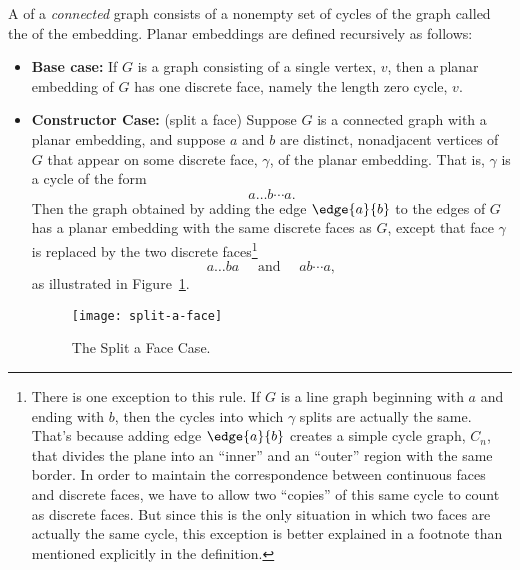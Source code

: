 \begin{definition}\label{embeddingdef}
A  of a \emph{connected} graph consists of a
nonempty set of cycles of the graph called the  of
the embedding.  Planar embeddings are defined recursively as follows:

\begin{itemize}

\item \textbf{Base case:} If $G$ is a graph consisting of a single vertex,
$v$, then a planar embedding of $G$ has one discrete face, namely the
length zero cycle, $v$.

\item \textbf{Constructor Case:} (split a face) Suppose $G$ is a
connected graph with a planar embedding, and suppose $a$ and $b$ are
distinct, nonadjacent vertices of $G$ that appear on some discrete face,
$\gamma$, of the planar embedding.  That is, $\gamma$ is a cycle of the form
\[
a \dots b \cdots a.
\]
Then the graph obtained by adding the edge $\edge{a}{b}$ to the edges of
$G$ has a planar embedding with the same discrete faces as $G$, except
that face $\gamma$ is replaced by the two discrete
faces\footnote{\label{C} There is one exception to this rule.  If $G$ is a
line graph beginning with $a$ and ending with $b$, then the cycles into
which $\gamma$ splits are actually the same.  That's because adding edge
$\edge{a}{b}$ creates a simple cycle graph, $C_n$, that divides the plane
into an ``inner'' and an ``outer'' region with the same border.  In order
to maintain the correspondence between continuous faces and discrete
faces, we have to allow two ``copies'' of this same cycle to count as
discrete faces.  But since this is the only situation in which two faces
are actually the same cycle, this exception is better explained in a
footnote than mentioned explicitly in the definition.}
\[
a\dots ba\quad \text{ and } \quad ab\cdots a, 
\]
as illustrated in Figure~\ref{fig:face-splitting}.

\begin{figure}[h]
\centering \texttt{[image: split-a-face]}
\caption{The Split a Face Case.}
\label{fig:face-splitting}
\end{figure}


\end{itemize}
\end{definition}
